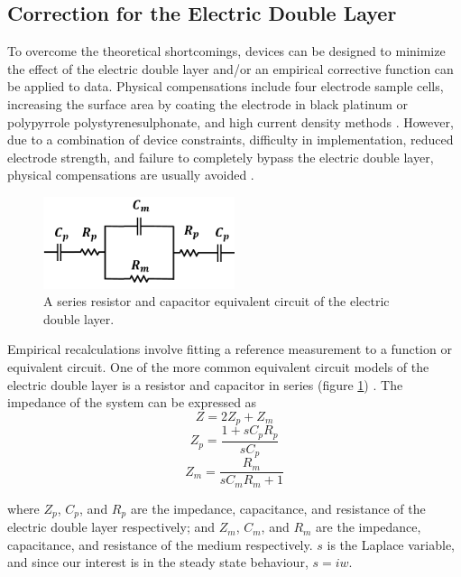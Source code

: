\subsection{Correction for the Electric Double Layer}

\par To overcome the theoretical shortcomings, devices can be designed to minimize the effect of the electric double layer and/or an empirical corrective function can be applied to data. Physical compensations include four electrode sample cells, increasing the surface area by coating the electrode in black platinum or polypyrrole polystyrenesulphonate, and high current density methods \cite{ishai_electrode_2013}. However, due to a combination of device constraints, difficulty in implementation, reduced electrode strength, and failure to completely bypass the electric double layer, physical compensations are usually avoided \cite{ishai_assessment_2012}. 

\begin{figure}
    \centering
    \includegraphics[width=0.5\textwidth]{images/edl_cap_equiv.png}
    \caption{A series resistor and capacitor equivalent circuit of the electric double layer.}
    \label{fig:edl_cap_equiv}
\end{figure}

\par Empirical recalculations involve fitting a reference measurement to a function or equivalent circuit. One of the more common equivalent circuit models of the electric double layer is a resistor and capacitor in series (figure \ref{fig:edl_cap_equiv}) \cite{feldman_fractal-polarization_1998}. The impedance of the system can be expressed as
\begin{equation}[h]
    Z = 2Z_p + Z_m
\end{equation}
\begin{equation}
    Z_p = \frac{1 + sC_pR_p}{sC_p}
\end{equation}
\begin{equation}
    Z_m = \frac{R_m}{sC_mR_m+1}
\end{equation}

\noindent where $Z_p$, $C_p$, and $R_p$ are the impedance, capacitance, and resistance of the electric double layer respectively; and $Z_m$, $C_m$, and $R_m$ are the impedance, capacitance, and resistance of the medium respectively. $s$ is the Laplace variable, and since our interest is in the steady state behaviour, $s = iw$.

